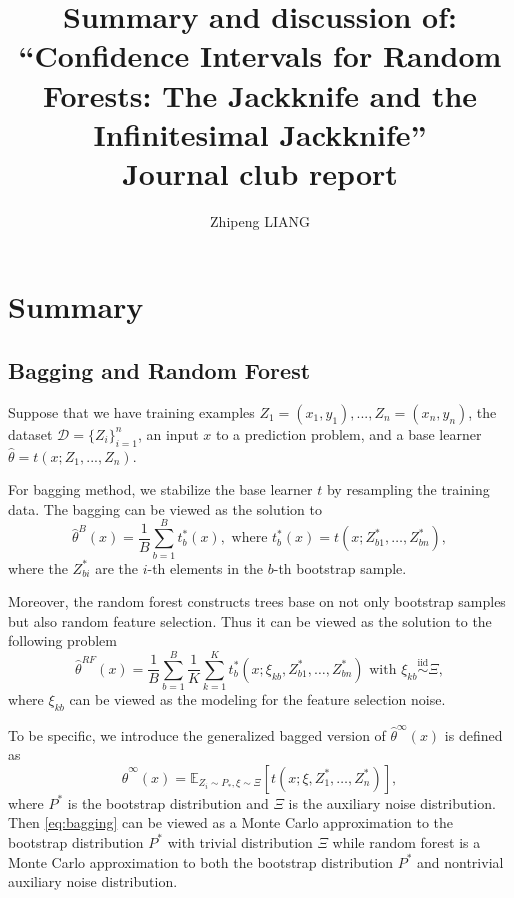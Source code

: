\documentclass[11pt]{article}
\title{Summary and discussion of: ``Confidence Intervals for Random Forests: The Jackknife and the Infinitesimal Jackknife'' \\
{\large Journal club report}}
\author{Zhipeng LIANG}
\date{}
\begin{document}
\maketitle

\section{Summary}
\subsection{Bagging and Random Forest}
Suppose that we have training examples $Z_1 = (x_1, y_1), ..., Z_n = (x_n, y_n)$, the dataset $\mathcal{D}=\{Z_i\}_{i=1}^n$, an input $x$ to a prediction problem, and a base learner $\hat{\theta} = t(x;Z_1, ..., Z_n)$.

For bagging method, we stabilize the base learner $t$ by resampling the training data. 
The bagging can be viewed as the solution to 
\begin{equation}
	\label{eq:bagging}
	\hat{\theta}^{B}(x)=\frac{1}{B} \sum_{b=1}^{B} t_{b}^{*}(x), \text { where } t_{b}^{*}(x)=t\left(x ; Z_{b 1}^{*}, \ldots, Z_{b n}^{*}\right),
\end{equation}
where the $Z^{*}_{bi}$ are the $i$-th elements in the $b$-th bootstrap sample.

Moreover, the random forest constructs trees base on not only bootstrap samples but also random feature selection.
Thus it can be viewed as the solution to the following problem 
\begin{equation}
	\label{eq:random-forest}
	\hat{\theta}^{R F}(x)=\frac{1}{B} \sum_{b=1}^{B} \frac{1}{K} \sum_{k=1}^{K} t_{b}^{*}\left(x ; \xi_{k b}, Z_{b 1}^{*}, \ldots, Z_{b n}^{*}\right) \text{ with } \xi_{k b} \stackrel{\mathrm{iid}}{\sim} \Xi,
\end{equation}
where $\xi_{kb}$ can be viewed as the modeling for the feature selection noise.


To be specific, we introduce the generalized bagged version of $\hat{\theta}^{\infty}(x)$ is defined as 
\begin{equation}
	\label{eq:bagged-version}
	\hat{\theta}^{\infty}(x)=\mathbb{E}_{Z_i\sim P_{*}, \xi \sim \Xi}\left[t\left(x; \xi, Z_{1}^{*}, \ldots, Z_{n}^{*}\right)\right],
\end{equation}
where $P^{*}$ is the bootstrap distribution and $\Xi$ is the auxiliary noise distribution. 
Then \eqref{eq:bagging} can be viewed as a Monte Carlo approximation to the bootstrap distribution $P^{*}$ with trivial distribution $\Xi$ while random forest is a Monte Carlo approximation to both the bootstrap distribution $P^{*}$ and nontrivial auxiliary noise distribution.
\end{document}
